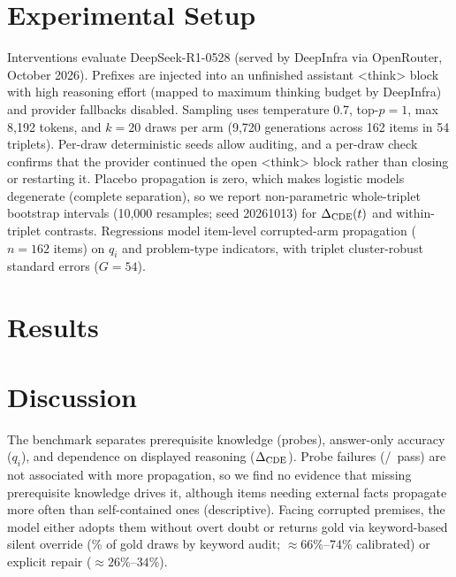 \section{Experimental Setup}
\label{sec:setup}

Interventions evaluate DeepSeek-R1-0528 (served by DeepInfra via OpenRouter, October 2026). Prefixes are injected into an unfinished assistant \textnormal{\textless{}think\textgreater{}} block with high reasoning effort (mapped to maximum thinking budget by DeepInfra) and provider fallbacks disabled. Sampling uses temperature 0.7, top-$p=1$, max 8,192 tokens, and $k=20$ draws per arm (9,720 generations across 162 items in 54 triplets). Per-draw deterministic seeds allow auditing, and a per-draw check confirms that the provider continued the open \textnormal{\textless{}think\textgreater{}} block rather than closing or restarting it. Placebo propagation is zero, which makes logistic models degenerate (complete separation), so we report non-parametric whole-triplet bootstrap intervals (10,000 resamples; seed 20261013) for $\Delta_{\mathrm{CDE}}(t)$ and within-triplet contrasts. Regressions model item-level corrupted-arm propagation ($n=162$ items) on $q_i$ and problem-type indicators, with triplet cluster-robust standard errors ($G=54$).

\section{Results}
\label{sec:results}



\section{Discussion}
\label{sec:discussion}

The benchmark separates prerequisite knowledge (probes), answer-only accuracy ($q_i$), and dependence on displayed reasoning ($\Delta_{\mathrm{CDE}}$). Probe failures (\ProbedPassCount/\ProbedTotalCount\ pass) are not associated with more propagation, so we find no evidence that missing prerequisite knowledge drives it, although items needing external facts propagate more often than self-contained ones (descriptive). Facing corrupted premises, the model either adopts them without overt doubt or returns gold via keyword-based silent override (\GoldSilentOverridePct\% of gold draws by keyword audit; $\approx 66\%$--$74\%$ calibrated) or explicit repair ($\approx 26\%$--$34\%$).

